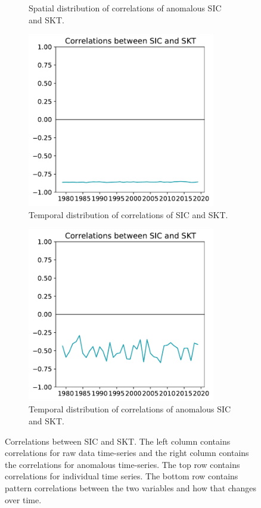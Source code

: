 \documentclass[../main.tex]{subfiles}
\begin{document}
\begin{figure}[h!]
\begin{subfigure}[h!]{0.49\textwidth}
\caption{Spatial distribution of correlations of anomalous SIC and SKT.}
\end{subfigure}
\begin{subfigure}[h!]{0.49\textwidth}
\centering
\includegraphics[width=0.9\textwidth]{images/week8/hres/corr_sic_skt_longterm_temporal}
\caption{Temporal distribution of correlations of SIC and SKT.}
\end{subfigure}
\begin{subfigure}[h!]{0.49\textwidth}
\centering
\includegraphics[width=0.9\textwidth]{images/week8/hres/corr_sic_skt_longterm_temporal_anmomalous}
\caption{Temporal distribution of correlations of anomalous SIC and SKT.}
\end{subfigure}
\caption{Correlations between SIC and SKT. The left column contains correlations for raw data time-series and the right column contains the correlations for anomalous time-series. The top row contains correlations for individual time series. The bottom row contains pattern correlations between the two variables and how that changes over time.}
\label{fig:correlation_between_SIC_and_SKT.}
\end{figure}
\end{document}
